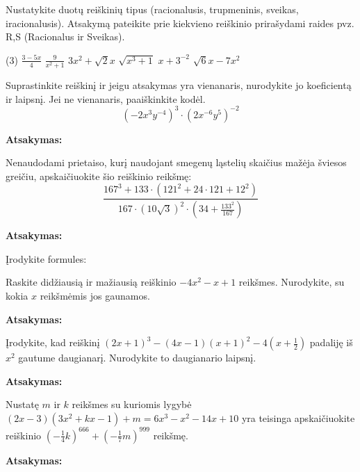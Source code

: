 \documentclass[12pt]{exam}
\newcommand{\atsakymas}{%
    \par\vspace{0.3cm}
    \textbf{Atsakymas:} \framebox[7cm]{\rule{0pt}{0.7cm}}
}
\begin{document}
\begin{questions}

\question[3] Nustatykite duotų reiškinių tipus (racionalusis, trupmeninis, sveikas, iracionalusis). Atsakymą pateikite prie kiekvieno reiškinio prirašydami raides pvz. R,S (Racionalus ir Sveikas).
\begin{tasks}[label-width=1.2em](3)
    \task $\displaystyle \frac{3-5x}{4}$
    \task $\displaystyle \frac{9}{x^2 + 1}$
    \task $\displaystyle 3x^2 + \sqrt{2} x$
    \task $\displaystyle \sqrt{x ^{3} +1}$
    \task $\displaystyle x+3 ^{-2} $
    \task $\displaystyle \sqrt{6}x-7x  ^{2} $
\end{tasks}
\droppoints

\question[4] Suprastinkite reiškinį ir jeigu atsakymas yra vienanaris, nurodykite jo koeficientą ir laipsnį. Jei ne vienanaris, paaiškinkite kodėl.
$$ \left( -2x^3y^{-4} \right)^3 \cdot \left( 2x^{-6}y^5 \right)^{-2} $$
\droppoints
\vspace{2.5cm}
\atsakymas

\question[4] Nenaudodami prietaiso, kurį naudojant smegenų ląstelių skaičius mažėja šviesos greičiu, apskaičiuokite šio reiškinio reikšmę:
\[ \frac{167^3+133 \cdot\left(121^2+24 \cdot 121+12^2\right)}{167 \cdot(10 \sqrt{3})^2 \cdot\left(34+\frac{133^2}{167}\right)} \] \vspace{3.5cm}
\atsakymas

\question Įrodykite formules:
\newpage

\question[4] Raskite didžiausią ir mažiausią reiškinio $-4x^2 - x + 1$ reikšmes. Nurodykite, su kokia $x$ reikšmėmis jos gaunamos.
\droppoints
\vspace{3.5cm}
\atsakymas

\question[5]  Įrodykite, kad reiškinį $(2x+1) ^{3} -(4x-1)(x+1) ^{2} -4\left(x+ \frac{1}{2} \right) $ padaliję iš $x ^{2}$ gautume daugianarį. Nurodykite to daugianario laipsnį. 
\droppoints
\vspace{3.5cm}
\atsakymas


\question[4] Nustatę $m$ ir $k$ reikšmes su kuriomis lygybė $(2 x-3)\left(3 x^2+k x-1\right)+m=6 x^3-x^2-14 x+10$ yra teisinga apskaičiuokite reiškinio $\left(- \frac{1}{4}k \right) ^{666}+ \left(-\frac{1}{7}m \right) ^{999}$ reikšmę. 
\droppoints
\vspace{8cm}
\atsakymas
\end{questions}
\end{document}
